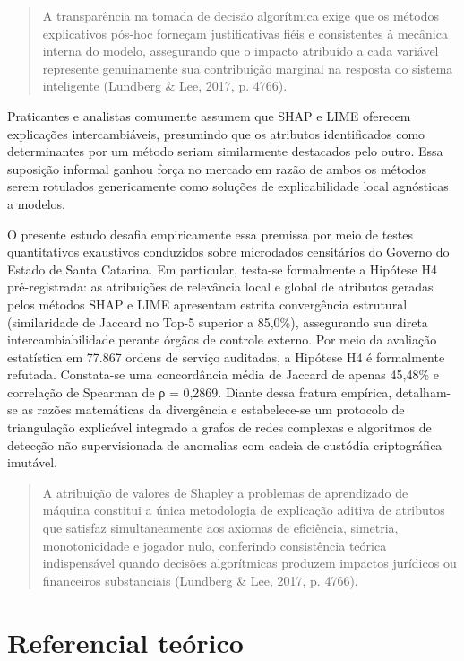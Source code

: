 \documentclass[12pt,a4paper]{article}
\begin{document}
\begin{quote}
\small A transparência na tomada de decisão algorítmica exige que os métodos explicativos pós-hoc forneçam justificativas fiéis e consistentes à mecânica interna do modelo, assegurando que o impacto atribuído a cada variável represente genuinamente sua contribuição marginal na resposta do sistema inteligente (Lundberg \& Lee, 2017, p. 4766).
\end{quote}

Praticantes e analistas comumente assumem que SHAP e LIME oferecem explicações intercambiáveis, presumindo que os atributos identificados como determinantes por um método seriam similarmente destacados pelo outro. Essa suposição informal ganhou força no mercado em razão de ambos os métodos serem rotulados genericamente como soluções de explicabilidade local agnósticas a modelos.

O presente estudo desafia empiricamente essa premissa por meio de testes quantitativos exaustivos conduzidos sobre microdados censitários do Governo do Estado de Santa Catarina. Em particular, testa-se formalmente a Hipótese H4 pré-registrada: as atribuições de relevância local e global de atributos geradas pelos métodos SHAP e LIME apresentam estrita convergência estrutural (similaridade de Jaccard no Top-5 superior a 85,0\%), assegurando sua direta intercambiabilidade perante órgãos de controle externo. Por meio da avaliação estatística em 77.867 ordens de serviço auditadas, a Hipótese H4 é formalmente refutada. Constata-se uma concordância média de Jaccard de apenas 45,48\% e correlação de Spearman de ρ = 0,2869. Diante dessa fratura empírica, detalham-se as razões matemáticas da divergência e estabelece-se um protocolo de triangulação explicável integrado a grafos de redes complexas e algoritmos de detecção não supervisionada de anomalias com cadeia de custódia criptográfica imutável.

\begin{quote}
\small A atribuição de valores de Shapley a problemas de aprendizado de máquina constitui a única metodologia de explicação aditiva de atributos que satisfaz simultaneamente aos axiomas de eficiência, simetria, monotonicidade e jogador nulo, conferindo consistência teórica indispensável quando decisões algorítmicas produzem impactos jurídicos ou financeiros substanciais (Lundberg \& Lee, 2017, p. 4766).
\end{quote}


\section{Referencial teórico}
\end{document}

